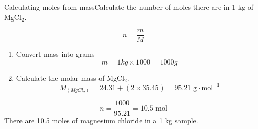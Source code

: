 \begin{wex}{Calculating moles from mass}{Calculate the number of moles there are in 1 kg of MgCl$_{2}$.}{
\begin{equation*}
n = \frac{m}{M}
\end{equation*}
\begin{enumerate}
\item{Convert mass into grams}
\begin{equation*}
m = 1 kg \times 1000 = 1000 g
\end{equation*}
\item{Calculate the molar mass of MgCl$_{2}$.}
\begin{equation*}
M_{(MgCl_{2})} = 24.31 + (2 \times 35.45) = 95.21 \text{ g} \cdot \text{mol}^{-1}
\end{equation*}
\end{enumerate}
\begin{equation*}
n = \frac{1000}{95.21} = 10.5 \text{ mol}
\end{equation*}
There are 10.5 moles of magnesium chloride in a 1 kg sample.
}
\end{wex}

